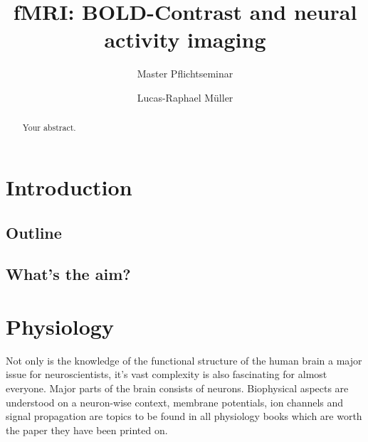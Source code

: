 \documentclass[a4paper]{scrartcl}
\begin{document}
\title{fMRI: BOLD-Contrast and neural activity imaging}
\subtitle{Master Pflichtseminar}
\author{Lucas-Raphael Müller}
\maketitle

\begin{abstract}
Your abstract.
\end{abstract}

\tableofcontents

\newpage

\section{Introduction}
\label{sec:intro}

\subsection{Outline}
\subsection{What's the aim?}

\section{Physiology}
Not only is the knowledge of the functional structure of the human brain a major issue for neuroscientists, it's vast complexity is also fascinating for almost everyone.
Major parts of the brain consists of neurons. 
Biophysical aspects are understood on a neuron-wise context, membrane potentials, ion channels and signal propagation are topics to be found in all physiology books which are worth the paper they have been printed on.\cite[577 et. seq.]{guyton}
\end{document}
